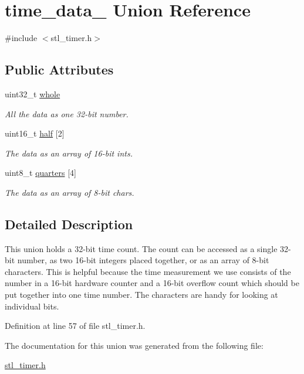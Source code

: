 \hypertarget{uniontime__data__32}{\section{time\-\_\-data\-\_ Union Reference}
\label{uniontime__data__32}
}


{\ttfamily \#include $<$stl\-\_\-timer.\-h$>$}

\subsection*{Public Attributes}
\begin{DoxyCompactItemize}
\item 
\hypertarget{uniontime__data__32_ad51c9fec10324c5f817aeebf9c140794}{uint32\-\_\-t \hyperlink{uniontime__data__32_ad51c9fec10324c5f817aeebf9c140794}{whole}}\label{uniontime__data__32_ad51c9fec10324c5f817aeebf9c140794}

\begin{DoxyCompactList}\small\item\em All the data as one 32-\/bit number. \end{DoxyCompactList}\item 
\hypertarget{uniontime__data__32_afabbb69506d0c19165470a7bb0c9a8dc}{uint16\-\_\-t \hyperlink{uniontime__data__32_afabbb69506d0c19165470a7bb0c9a8dc}{half} \mbox{[}2\mbox{]}}\label{uniontime__data__32_afabbb69506d0c19165470a7bb0c9a8dc}

\begin{DoxyCompactList}\small\item\em The data as an array of 16-\/bit ints. \end{DoxyCompactList}\item 
\hypertarget{uniontime__data__32_a55b692764e8f62719ec296e681cc7864}{uint8\-\_\-t \hyperlink{uniontime__data__32_a55b692764e8f62719ec296e681cc7864}{quarters} \mbox{[}4\mbox{]}}\label{uniontime__data__32_a55b692764e8f62719ec296e681cc7864}

\begin{DoxyCompactList}\small\item\em The data as an array of 8-\/bit chars. \end{DoxyCompactList}\end{DoxyCompactItemize}


\subsection{Detailed Description}
This union holds a 32-\/bit time count. The count can be accessed as a single 32-\/bit number, as two 16-\/bit integers placed together, or as an array of 8-\/bit characters. This is helpful because the time measurement we use consists of the number in a 16-\/bit hardware counter and a 16-\/bit overflow count which should be put together into one time number. The characters are handy for looking at individual bits. 

Definition at line 57 of file stl\-\_\-timer.\-h.



The documentation for this union was generated from the following file\-:\begin{DoxyCompactItemize}
\item 
\hyperlink{stl__timer_8h}{stl\-\_\-timer.\-h}\end{DoxyCompactItemize}
